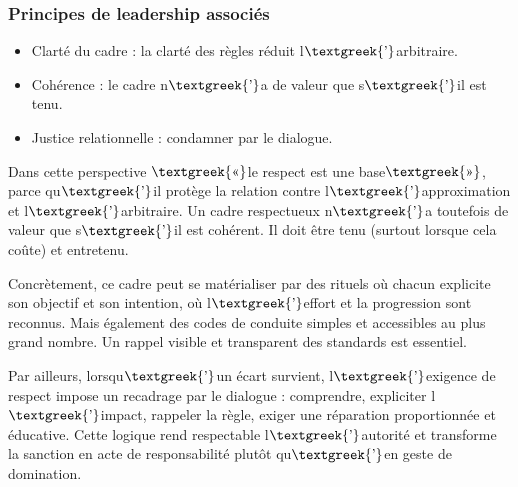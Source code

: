 \documentclass{article}
\begin{document}
\subsubsection{Principes de leadership associés}
\begin{itemize}
\item Clarté du cadre : la clarté des règles réduit l$\text{\textgreek{’}}$arbitraire.
\item Cohérence : le cadre n$\text{\textgreek{’}}$a de valeur que s$\text{\textgreek{’}}$il est tenu.
\item Justice relationnelle : condamner par le dialogue.
\end{itemize}
Dans cette perspective $\text{\textgreek{«}}$le respect est une base$\text{\textgreek{»}}$, parce
qu$\text{\textgreek{’}}$il protège la relation contre l$\text{\textgreek{’}}$approximation et
l$\text{\textgreek{’}}$arbitraire. Un cadre respectueux n$\text{\textgreek{’}}$a toutefois de valeur que
s$\text{\textgreek{’}}$il est cohérent. Il doit être tenu (surtout lorsque cela coûte) et entretenu. 

Concrètement, ce cadre peut se matérialiser par des rituels où chacun explicite son objectif et son intention, où
l$\text{\textgreek{’}}$effort et la progression sont reconnus. Mais également des codes de conduite simples et
accessibles au plus grand nombre. Un rappel visible et transparent des standards est essentiel. 

Par ailleurs, lorsqu$\text{\textgreek{’}}$un écart survient, l$\text{\textgreek{’}}$exigence de respect impose un
recadrage par le dialogue : comprendre, expliciter l$\text{\textgreek{’}}$impact, rappeler la règle, exiger une
réparation proportionnée et éducative. Cette logique rend respectable l$\text{\textgreek{’}}$autorité et transforme la
sanction en acte de responsabilité plutôt qu$\text{\textgreek{’}}$en geste de domination.
\end{document}
